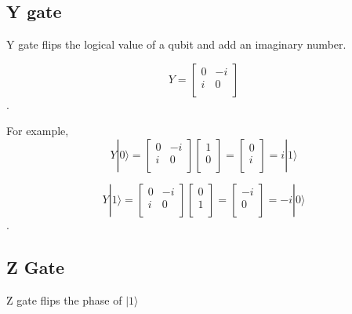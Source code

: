 \subsection{Y gate}

Y gate flips the logical value of a qubit and add an imaginary number.

\begin{equation}
 Y = \begin{bmatrix}
0 & -i \\
i & 0 \\
\end{bmatrix}
\end{equation}.

For example,
\begin{equation}
Y|0\rangle = \begin{bmatrix}
0 & -i \\
i & 0 \\
\end{bmatrix} 
\left[
\begin{array}{c}
1 \\
0 \\
\end{array}
\right]
= \left[
\begin{array}{c}
0 \\
i \\
\end{array}
\right]
= i|1\rangle
\end{equation}

\begin{equation}
Y|1\rangle = \begin{bmatrix}
0 & -i \\
i & 0 \\
\end{bmatrix} 
\left[
\begin{array}{c}
0 \\
1  \\
\end{array}
\right]
= \left[
\begin{array}{c}
-i \\
0 \\
\end{array}
\right]
= -i|0\rangle
\end{equation}.

\subsection{Z Gate}
Z gate flips the phase of $ |1\rangle$

